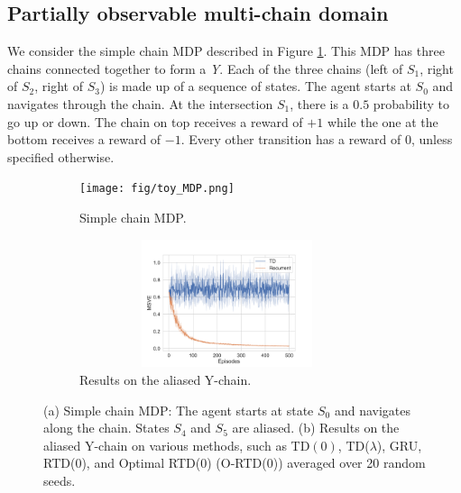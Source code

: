 \subsection{Partially observable multi-chain domain}
We consider the simple chain MDP described in Figure \ref{fig:toy MDP}. This MDP has three chains connected together to form a \emph{Y}. Each of the three chains (left of $S_1$, right of $S_2$, right of $S_3$) is made up of a sequence of states. The agent starts at $S_0$ and navigates through the chain. At the intersection $S_1$, there is a $0.5$ probability to go up or down. The chain on top receives a reward of $+1$ while the one at the bottom receives a reward of $-1$. Every other transition has a reward of $0$, unless specified otherwise.
\begin{figure}[h]
\centering
\begin{subfigure}[b]{.45\textwidth}    \texttt{[image: fig/toy\_MDP.png]}
    \caption{Simple chain MDP.}
    \label{fig:toy MDP}
\end{subfigure}
\begin{subfigure}[b]{.45\textwidth}
    \centering
    \includegraphics[width=0.95\textwidth,height=3.75cm]{fig/POMDP.pdf}
    \caption{Results on the aliased Y-chain.}
    \label{fig:pomdp}
\end{subfigure}
\caption{(a) Simple chain MDP: The agent starts at state $S_0$ and navigates along the chain. States $S_4$ and $S_5$ are aliased. (b) Results on the aliased Y-chain on various methods, such as TD$(0)$, TD($\lambda$), GRU, RTD($0$), and Optimal RTD($0$) (O-RTD(0)) averaged over 20 random seeds.}
\end{figure}
